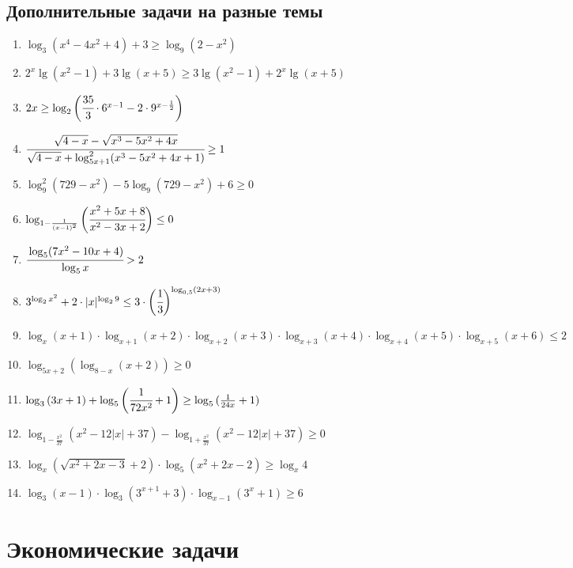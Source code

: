 \documentclass[12pt]{article}
\begin{document}
\subsection{Дополнительные задачи на разные темы}
\begin{enumerate}[start=1,label={\itshape\bfseries \arabic*.}]
    \item $\log_3(x^4 - 4x^2 + 4) + 3 \ge \log_9(2 - x^2)$
    \item $2^x \lg(x^2 - 1) + 3\lg(x + 5) \ge 3\lg(x^2 - 1) + 2^x \lg(x + 5)$
    \item $2x \ge \log_2\bigg( \cfrac{35}{3} \cdot 6^{x - 1} - 2 \cdot 9^{x - \frac{1}{2}} \bigg)$
    \item $\cfrac{\sqrt{4 - x} - \sqrt{x^3 - 5x^2 + 4x}}{\sqrt{4 - x} + \log_{5x + 1}^{2}(x^3 - 5x^2 + 4x + 1)} \ge 1$
    \item $\log_{9}^{2}(729 - x^2) - 5\log_{9}(729 - x^2) + 6 \ge 0$
    \item $\log_{1 - \frac{1}{(x - 1)^2}}\bigg( \cfrac{x^2 + 5x + 8}{x^2 - 3x + 2} \bigg) \le 0$
    \item $\cfrac{\log_{5}(7x^2 - 10x + 4)}{\log_{5}{x}} > 2$
    \item $3^{\log_2{x^2}} + 2 \cdot |x|^{\log_2{9}} \le 3 \cdot \bigg( \cfrac{1}{3} \bigg)^{\log_{0,5}(2x + 3)}$
    \item $\log_{x}(x + 1) \cdot \log_{x + 1}(x + 2) \cdot \log_{x + 2}(x + 3) \cdot \log_{x + 3}(x + 4) \cdot \log_{x + 4}(x + 5) \cdot \log_{x + 5}(x + 6) \le 2$
    \item $\log_{5x + 2}(\log_{8 - x}(x + 2)) \ge 0$
    \item $\log_3{(3x + 1)} + \log_5{\bigg( \cfrac{1}{72x^2} + 1\bigg)} \ge \log_5{(\frac{1}{24x} + 1)}$
    \item $\log_{1 - \frac{x^2}{37}} (x^2 - 12|x| + 37) - \log_{1 + \frac{x^2}{37}}(x^2 - 12|x| + 37) \ge 0$
    \item $\log_{x}(\sqrt{x^2 + 2x - 3} + 2) \cdot \log_{5}(x^2 + 2x - 2) \ge \log_x{4}$
    \item $\log_3{(x - 1)} \cdot \log_3(3^{x + 1} + 3) \cdot \log_{x - 1}(3^x + 1) \ge 6$
\end{enumerate}


\section{Экономические задачи}
\end{document}
